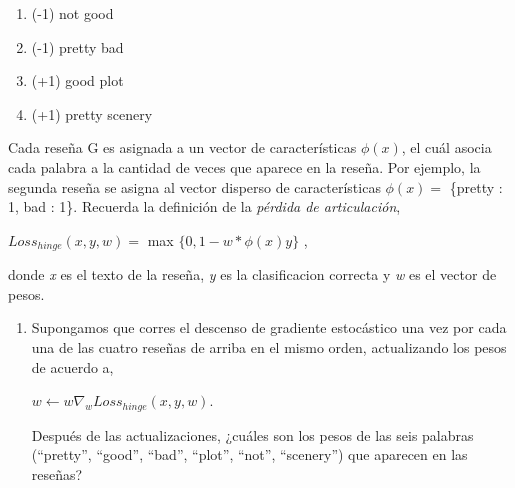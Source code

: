 \documentclass[11pt,letterpaper]{article}
\begin{document}
\begin{enumerate}
    \item (-1) not good
    \item (-1) pretty bad
    \item (+1) good plot
    \item (+1) pretty scenery
\end{enumerate}

Cada reseña G es asignada a un vector de características \begin{math} \phi(x) \end{math}, el cuál asocia cada palabra a la cantidad de veces que aparece en la reseña. Por ejemplo, la segunda reseña se asigna al vector disperso de características \begin{math} \phi(x) = \end{math} \{pretty : 1, bad : 1\}. Recuerda la definición de la \textit{pérdida de articulación},

\begin{center}
    \begin{math}
        Loss_{hinge}(x,y,w) = 
    \end{math}
    max
    \begin{math}
        \{ 0,1-w * \phi(x)y \}
    \end{math}
    ,
\end{center}

donde \textit{x} es el texto de la reseña, \textit{y} es la clasificacion correcta y \textit{w} es el vector de pesos.

\begin{enumerate}
    \item Supongamos que corres el descenso de gradiente estocástico una vez por cada una de las cuatro reseñas de arriba en el mismo orden, actualizando los pesos de acuerdo a,
    
\begin{center}
    \begin{math}
        w \leftarrow w\nabla_w Loss_{hinge}(x,y,w).
    \end{math}
\end{center}
    
Después de las actualizaciones, ¿cuáles son los pesos de las seis palabras (“pretty”, “good”, “bad”, “plot”, “not”, “scenery”) que aparecen en las reseñas?
    
\end{enumerate}
\end{document}
